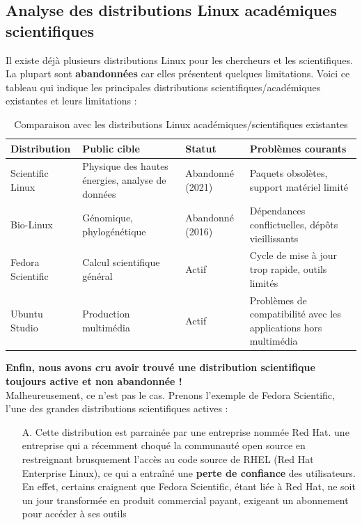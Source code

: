 \begin{itemize}[leftmargin=*,nosep]
\subsection{Analyse des distributions Linux académiques scientifiques}

Il existe déjà plusieurs distributions Linux pour les chercheurs et les scientifiques. La plupart sont \textbf{abandonnées} car elles présentent quelques limitations. Voici ce tableau qui indique les principales distributions scientifiques/académiques existantes et leurs limitations :

\begin{table}[H]
\centering
\begin{tabularx}{\textwidth}{|l|X|l|X|}
\hline
\textbf{Distribution} & \textbf{Public cible} & \textbf{Statut} & \textbf{Problèmes courants} \\
\hline
Scientific Linux & Physique des hautes énergies, analyse de données & Abandonné (2021) & Paquets obsolètes, support matériel limité \\
\hline
Bio-Linux & Génomique, phylogénétique & Abandonné (2016) & Dépendances conflictuelles, dépôts vieillissants \\
\hline
Fedora Scientific & Calcul scientifique général & Actif & Cycle de mise à jour trop rapide, outils limités \\
\hline
Ubuntu Studio & Production multimédia & Actif & Problèmes de compatibilité avec les applications hors multimédia \\
\hline
\end{tabularx}
\caption{Comparaison avec les distributions Linux académiques/scientifiques existantes}
\label{tab:comparaison}
\end{table}




\textbf{Enfin, nous avons cru avoir trouvé une distribution scientifique toujours active et non abandonnée !} \\
Malheureusement, ce n’est pas le cas. Prenons l’exemple de Fedora Scientific, l’une des grandes distributions scientifiques actives :

\begin{itemize}
    \item[A.] Cette distribution est parrainée par une entreprise nommée Red Hat.  une entreprise  qui a récemment choqué la communauté open source en restreignant brusquement l’accès au code source de RHEL (Red Hat Enterprise Linux), ce qui a entraîné une \textbf{perte de confiance}  des utilisateurs. En effet, certains craignent que Fedora Scientific, étant liée à Red Hat, ne soit un jour transformée en produit commercial payant, exigeant un abonnement pour accéder à ses outils
    

\end{itemize}
\end{itemize}
